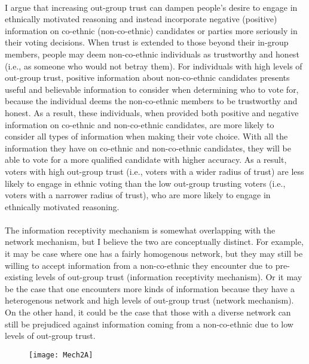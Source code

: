\documentclass[a4paper, 12pt]{article}
\begin{document}
\paragraph{}
I argue that increasing out-group trust can dampen people’s desire to engage in ethnically motivated reasoning and instead incorporate negative (positive) information on co-ethnic (non-co-ethnic) candidates or parties more seriously in their voting decisions. When trust is extended to those beyond their in-group members, people may deem non-co-ethnic individuals as trustworthy and honest (i.e., as someone who would not betray them). For individuals with high levels of out-group trust, positive information about non-co-ethnic candidates presents useful and believable information to consider when determining who to vote for, because the individual deems the non-co-ethnic members to be trustworthy and honest. As a result, these individuals, when provided both positive and negative information on co-ethnic and non-co-ethnic candidates, are more likely to consider all types of information when making their vote choice. With all the information they have on co-ethnic and non-co-ethnic candidates, they will be able to vote for a more qualified candidate with higher accuracy. As a result, voters with high out-group trust (i.e., voters with a wider radius of trust) are less likely to engage in ethnic voting than the low out-group trusting voters (i.e., voters with a narrower radius of trust), who are more likely to engage in ethnically motivated reasoning.
\paragraph{}
The information receptivity mechanism is somewhat overlapping with the network mechanism, but I believe the two are conceptually distinct. For example, it may be case where one has a fairly homogenous network, but they may still be willing to accept information from a non-co-ethnic they encounter due to pre-existing levels of out-group trust (information receptivity mechanism). Or it may be the case that one encounters more kinds of information because they have a heterogenous network and high levels of out-group trust (network mechanism). On the other hand, it could be the case that those with a diverse network can still be prejudiced against information coming from a non-co-ethnic due to low levels of out-group trust.   
\begin{figure}[H]
	\centering
	\texttt{[image: Mech2A]}
\end{figure}
\end{document}
